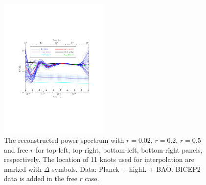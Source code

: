 \documentclass[11pt]{article}
\def \halffigwidth{0.48\textwidth}
\begin{document}
\begin{figure}
  \includegraphics[width=\halffigwidth,  trim = 1in 2.9in 1in 2.9in]{spline0_p11_power_traj.pdf}
  \caption{The reconstructed power spectrum with $r = 0.02$, $r=0.2$, $r=0.5$ and free $r$ for top-left, top-right, bottom-left, bottom-right panels, respectively. The location of 11 knots used for interpolation are marked with $\Delta$ symbols. Data: Planck + highL + BAO. BICEP2 data is added in the free $r$ case. \label{fig:traj_power}}
\end{figure}
\end{document}
